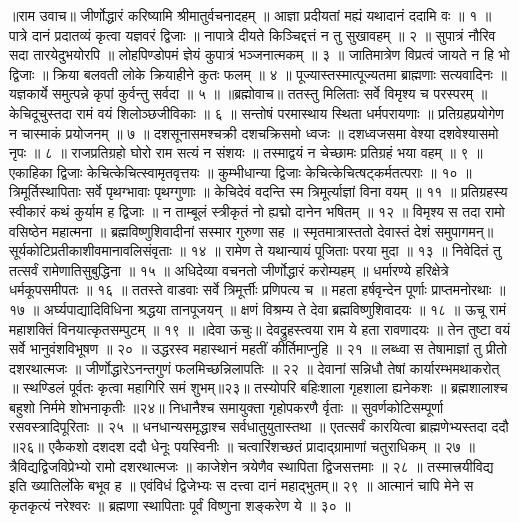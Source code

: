 ॥राम उवाच॥
जीर्णोद्धारं करिष्यामि श्रीमातुर्वचनादहम् ॥
आज्ञा प्रदीयतां मह्यं यथादानं ददामि वः ॥ १ ॥
पात्रे दानं प्रदातव्यं कृत्वा यज्ञवरं द्विजाः ॥
नापात्रे दीयते किञ्चिद्दत्तं न तु सुखावहम् ॥ २ ॥
सुपात्रं नौरिव सदा तारयेदुभयोरपि ॥
लोहपिण्डोपमं ज्ञेयं कुपात्रं भञ्जनात्मकम् ॥ ३ ॥
जातिमात्रेण विप्रत्वं जायते न हि भो द्विजाः ॥
क्रिया बलवती लोके क्रियाहीने कुतः फलम् ॥ ४ ॥
पूज्यास्तस्मात्पूज्यतमा ब्राह्मणाः सत्यवादिनः ॥
यज्ञकार्ये समुत्पन्ने कृपां कुर्वन्तु सर्वदा ॥ ५ ॥
॥ब्रह्मोवाच॥
ततस्तु मिलिताः सर्वे विमृश्य च परस्परम् ॥
केचिदूचुस्तदा रामं वयं शिलोञ्छजीविकाः ॥ ६ ॥
सन्तोषं परमास्थाय स्थिता धर्मपरायणाः ॥
प्रतिग्रहप्रयोगेण न चास्माकं प्रयोजनम् ॥ ७ ॥
दशसूनासमश्चक्री दशचक्रिसमो ध्वजः ॥
दशध्वजसमा वेश्या दशवेश्यासमो नृपः ॥ ८ ॥
राजप्रतिग्रहो घोरो राम सत्यं न संशयः ॥
तस्माद्वयं न चेच्छामः प्रतिग्रहं भया वहम् ॥ ९ ॥
एकाहिका द्विजाः केचित्केचित्स्वामृतवृत्तयः ॥
कुम्भीधान्या द्विजाः केचित्केचित्षट्कर्मतत्पराः ॥ १० ॥
त्रिमूर्तिस्थापिताः सर्वे पृथग्भावाः पृथग्गुणाः ॥
केचिदेवं वदन्ति स्म त्रिमूर्त्याज्ञां विना वयम् ॥ ११ ॥
प्रतिग्रहस्य स्वीकारं कथं कुर्याम ह द्विजाः ॥
न ताम्बूलं स्त्रीकृतं नो ह्यद्मो दानेन भषितम् ॥ १२ ॥
विमृश्य स तदा रामो वसिष्ठेन महात्मना ॥
ब्रह्मविष्णुशिवादीनां सस्मार गुरुणा सह ॥
स्मृतमात्रास्ततो देवास्तं देशं समुपागमन्॥
सूर्यकोटिप्रतीकाशीवमानावलिसंवृताः ॥ १४ ॥
रामेण ते यथान्यायं पूजिताः परया मुदा ॥ १३ ॥
निवेदितं तु तत्सर्वं रामेणातिसुबुद्धिना ॥ १५ ॥
अधिदेव्या वचनतो जीर्णोद्धारं करोम्यहम् ॥
धर्मारण्ये हरिक्षेत्रे धर्मकूपसमीपतः ॥ १६ ॥
ततस्ते वाडवाः सर्वे त्रिमूर्त्तीः प्रणिपत्य च ॥
महता हर्षवृन्देन पूर्णाः प्राप्तमनोरथाः ॥ १७ ॥
अर्घ्यपाद्यादिविधिना श्रद्धया तानपूजयन् ॥
क्षणं विश्रम्य ते देवा ब्रह्मविष्णुशिवादयः ॥ १८ ॥
ऊचू रामं महाशक्तिं विनयात्कृतसम्पुटम् ॥ १९ ॥
॥देवा ऊचुः॥
देवद्रुहस्त्वया राम ये हता रावणादयः ॥
तेन तुष्टा वयं सर्वे भानुवंशविभूषण ॥ २० ॥
उद्धरस्व महास्थानं महतीं कीर्तिमाप्नुहि ॥ २१ ॥
लब्ध्वा स तेषामाज्ञां तु प्रीतो दशरथात्मजः ॥
जीर्णोद्धारेऽनन्तगुणं फलमिच्छन्निलापतिः ॥ २२ ॥
देवानां सन्निधौ तेषां कार्यारम्भमथाकरोत् ॥
स्थण्डिलं पूर्वतः कृत्वा महागिरि समं शुभम्॥२३॥
तस्योपरि बहिःशाला गृहशाला ह्यनेकशः ॥
ब्रह्मशालाश्च बहुशो निर्ममे शोभनाकृतीः ॥२४॥
निधानैश्च समायुक्ता गृहोपकरणै र्वृताः ॥
सुवर्णकोटिसम्पूर्णा रसवस्त्रादिपूरिताः ॥ २५ ॥
धनधान्यसमृद्धाश्च सर्वधातुयुतास्तथा ॥
एतत्सर्वं कारयित्वा ब्राह्मणेभ्यस्तदा ददौ ॥२६॥
एकैकशो दशदश ददौ धेनूः पयस्विनीः ॥
चत्वारिंशच्छतं प्रादाद्ग्रामाणां चतुराधिकम् ॥ २७ ॥
त्रैविद्यद्विजविप्रेभ्यो रामो दशरथात्मजः ॥
काजेशेन त्रयेणैव स्थापिता द्विजसत्तमाः ॥ २८ ॥
तस्मात्त्रयीविद्य इति ख्यातिर्लोके बभूव ह ॥
एवंविधं द्विजेभ्यः स दत्त्वा दानं महाद्भुतम्॥ २९ ॥
आत्मानं चापि मेने स कृतकृत्यं नरेश्वरः ॥
ब्रह्मणा स्थापिताः पूर्वं विष्णुना शङ्करेण ये ॥ ३० ॥
